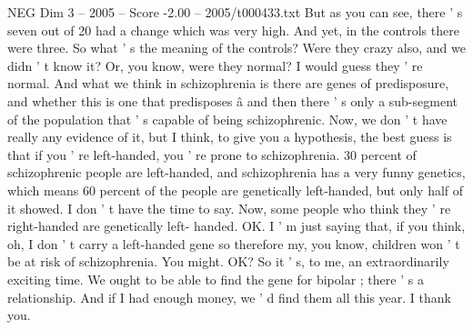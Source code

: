 \begin{textsample}{NEG Dim 3 – 2005 – Score -2.00 – 2005/t000433.txt}
But as you can see, there ' s seven out of 20 had a change which was very high.
And yet, in the controls there were three.
So what ' s the meaning of the controls?
Were they crazy also, and we didn ' t know it?
Or, you know, were they normal?
I would guess they ' re normal.
And what we think in schizophrenia is there are genes of predisposure, and whether this is one that predisposes â and then there ' s only a sub-segment of the population that ' s capable of being schizophrenic.
Now, we don ' t have really any evidence of it, but I think, to give you a hypothesis, the best guess is that if you ' re left-handed, you ' re prone to schizophrenia. 30 percent of schizophrenic people are left-handed, and schizophrenia has a very funny genetics, which means 60 percent of the people are genetically left-handed, but only half of it showed.
I don ' t have the time to say.
Now, some people who think they ' re right-handed are genetically left- handed.
OK.
I ' m just saying that, if you think, oh, I don ' t carry a left-handed gene so therefore my, you know, children won ' t be at risk of schizophrenia.
You might.
OK?
So it ' s, to me, an extraordinarily exciting time.
We ought to be able to find the gene for bipolar ; there ' s a relationship.
And if I had enough money, we ' d find them all this year.
I thank you.

\end{textsample}
